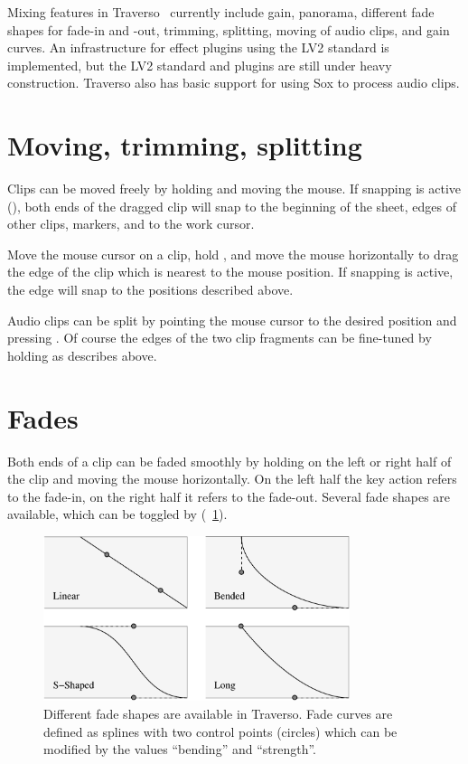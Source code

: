 Mixing features in Traverso \Version\ currently include gain, panorama, different fade shapes for fade-in and -out, trimming, splitting, moving of audio clips, and gain curves. An infrastructure for effect plugins using the LV2 standard is implemented, but  the LV2 standard and plugins are still under heavy construction. Traverso also has basic support for using Sox to process audio clips.

\section{Moving, trimming, splitting}
Clips can be moved freely by holding  and moving the mouse. If snapping is active (), both ends of the dragged clip will snap to the beginning of the sheet, edges of other clips, markers, and to the work cursor.

Move the mouse cursor on a clip, hold , and move the mouse horizontally to drag the edge of the clip which is nearest to the mouse position. If snapping is active, the edge will snap to the positions described above.

Audio clips can be split by pointing the mouse cursor to the desired position and pressing . Of course the edges of the two clip fragments can be fine-tuned by holding  as describes above.

\section{Fades}
Both ends of a clip can be faded smoothly by holding  on the left or right half of the clip and moving the mouse horizontally. On the left half the key action refers to the fade-in, on the right half it refers to the fade-out. Several fade shapes are available, which can be toggled by  (\FigB~\ref{fig_fades01}).

\begin{figure}[t]
 \centering\includegraphics[width=0.8\textwidth]{../images/fades}
 \caption{Different fade shapes are available in Traverso. Fade curves are defined as splines with two control points (circles) which can be modified by the values ``bending'' and ``strength''.}
 \label{fig_fades01}
\end{figure}

